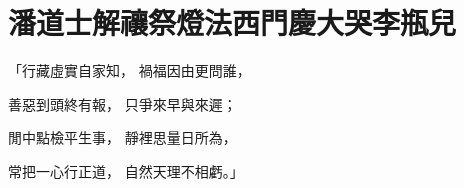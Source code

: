 %

\chapter{潘道士解禳祭燈法\KG 西門慶大哭李瓶兒}


\begin{showcontents}{}



「行藏虛實自家知，  禍福因由更問誰，

善惡到頭終有報，  只爭來早與來遲；

閒中點檢平生事，  靜裡思量日所為，

常把一心行正道，  自然天理不相虧。」


\end{showcontents}
